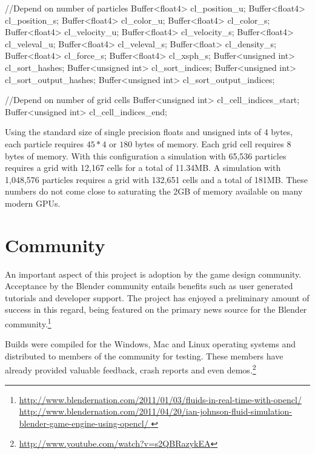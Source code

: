 \begin{cppcode}{0}
        //Depend on number of particles
        Buffer<float4>      cl_position_u;
        Buffer<float4>      cl_position_s;
        Buffer<float4>      cl_color_u;
        Buffer<float4>      cl_color_s;
        Buffer<float4>      cl_velocity_u;
        Buffer<float4>      cl_velocity_s;
        Buffer<float4>      cl_veleval_u;
        Buffer<float4>      cl_veleval_s;
        Buffer<float>       cl_density_s;
        Buffer<float4>      cl_force_s;
        Buffer<float4>      cl_xsph_s;
        Buffer<unsigned int>         cl_sort_hashes;
        Buffer<unsigned int>         cl_sort_indices;
        Buffer<unsigned int>         cl_sort_output_hashes;
        Buffer<unsigned int>         cl_sort_output_indices;

        //Depend on number of grid cells
        Buffer<unsigned int>         cl_cell_indices_start;
        Buffer<unsigned int>         cl_cell_indices_end;
\end{cppcode}

Using the standard size of single precision floats and unsigned ints of 4
bytes, each particle requires $45*4$ or $180$ bytes of memory. Each grid cell
requires $8$ bytes of memory. With this configuration a simulation with 65,536
particles requires a grid with 12,167 cells for a total of 11.34MB. A
simulation with 1,048,576 particles requires a grid with 132,651 cells and a
total of 181MB. These numbers do not come close to saturating the 2GB of memory
available on many modern GPUs.


\section{Community}
An important aspect of this project is adoption by the game design community.
Acceptance by the Blender community entails benefits such as user generated
tutorials and developer support. The project has enjoyed a preliminary amount
of success in this regard, being featured on the primary news source for
the Blender community.\footnote{
\url{http://www.blendernation.com/2011/01/03/fluids-in-real-time-with-opencl/}
\\ 
\url{
http://www.blendernation.com/2011/04/20/ian-johnson-fluid-simulation-blender-game-engine-using-opencl/
} }

Builds were compiled for the Windows, Mac and Linux operating systems and
distributed to members of the community for testing. These members have already
provided valuable feedback, crash reports and even demos.\footnote{ \url{http://www.youtube.com/watch?v=s2QBRazykEA}} 

